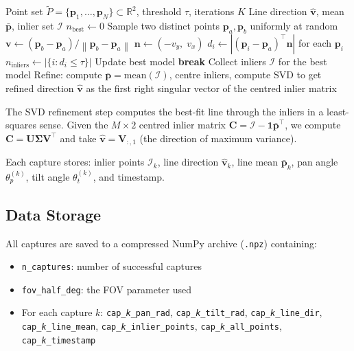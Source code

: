 \documentclass[12pt,a4paper]{article}
\newcommand{\R}{\mathbb{R}}
\newcommand{\pvec}{\mathbf{p}}
\newcommand{\norm}[1]{\left\|#1\right\|}
\newcommand{\code}[1]{\texttt{#1}}
\begin{document}
\begin{algorithm}[H]
\caption{RANSAC 2D Line Fit}
\label{alg:ransac}
\begin{algorithmic}[1]
\Require Point set $\tilde{P} = \{\pvec_1, \ldots, \pvec_N\} \subset \R^2$,
         threshold $\tau$, iterations $K$
\Ensure Line direction $\hat{\mathbf{v}}$, mean $\bar{\pvec}$, inlier set $\mathcal{I}$
\State $n_{\text{best}} \gets 0$
 
    \State Sample two distinct points $\pvec_a, \pvec_b$ uniformly at random
    \State $\mathbf{v} \gets (\pvec_b - \pvec_a) / \norm{\pvec_b - \pvec_a}$
    \State $\mathbf{n} \gets (-v_y,\; v_x)$ 
    \State $d_i \gets |(\pvec_i - \pvec_a)^\top \mathbf{n}|$ for each $\pvec_i$
    \State $n_{\text{inliers}} \gets |\{i : d_i \le \tau\}|$
        \State Update best model
    \EndIf
        \State \textbf{break} 
    \EndIf
\EndFor
\State Collect inliers $\mathcal{I}$ for the best model
\State Refine: compute $\bar{\pvec} = \text{mean}(\mathcal{I})$, centre inliers,
       compute SVD to get refined direction $\hat{\mathbf{v}}$ as the first
       right singular vector of the centred inlier matrix
\end{algorithmic}
\end{algorithm}

The SVD refinement step computes the best-fit line through the inliers
in a least-squares sense. Given the $M \times 2$ centred inlier matrix
$\mathbf{C} = \mathcal{I} - \mathbf{1}\bar{\pvec}^\top$, we compute
$\mathbf{C} = \mathbf{U}\bm{\Sigma}\mathbf{V}^\top$ and take
$\hat{\mathbf{v}} = \mathbf{V}_{:,1}$ (the direction of maximum variance).

Each capture stores: inlier points $\mathcal{I}_k$, line direction
$\hat{\mathbf{v}}_k$, line mean $\bar{\pvec}_k$, pan angle $\theta_p^{(k)}$,
tilt angle $\theta_t^{(k)}$, and timestamp.

\subsection{Data Storage}

All captures are saved to a compressed NumPy archive (\code{.npz}) containing:
\begin{itemize}[nosep]
    \item \code{n\_captures}: number of successful captures
    \item \code{fov\_half\_deg}: the FOV parameter used
    \item For each capture $k$: \code{cap\_\textit{k}\_pan\_rad},
          \code{cap\_\textit{k}\_tilt\_rad}, \code{cap\_\textit{k}\_line\_dir},
          \code{cap\_\textit{k}\_line\_mean}, \code{cap\_\textit{k}\_inlier\_points},
          \code{cap\_\textit{k}\_all\_points}, \code{cap\_\textit{k}\_timestamp}
\end{itemize}
\end{document}
